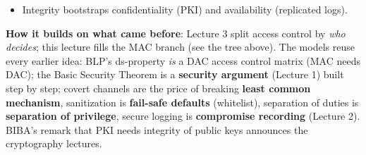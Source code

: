 \begin{recapbox}[title={Exam-ready recap --- Lecture 4: Mandatory Access Control}]
\begin{itemize}
        directly (Pepsi then Coca-Cola) or indirectly (via IBM and a colleague). Sanitized
        ``general market information'' is allowed.
  \item Integrity bootstraps confidentiality (PKI) and availability (replicated logs).
\end{itemize}
\textbf{How it builds on what came before}: Lecture 3 split access control by \emph{who decides};
this lecture fills the MAC branch (see the tree above). The models reuse every earlier idea:
BLP's ds-property \emph{is} a DAC access control matrix (MAC needs DAC); the Basic Security
Theorem is a \textbf{security argument} (Lecture 1) built step by step; covert channels are the
price of breaking \textbf{least common mechanism}, sanitization is \textbf{fail-safe defaults}
(whitelist), separation of duties is \textbf{separation of privilege}, secure logging is
\textbf{compromise recording} (Lecture 2). BIBA's remark that PKI needs integrity of public keys
announces the cryptography lectures.
\end{recapbox}
